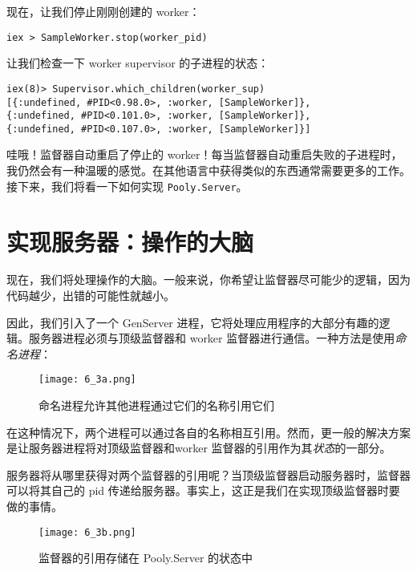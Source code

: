 现在，让我们停止刚刚创建的 worker：

\begin{code}{}
\begin{verbatim}
iex > SampleWorker.stop(worker_pid)
\end{verbatim}
\end{code}

让我们检查一下 worker supervisor 的子进程的状态：

\begin{code}{}
\begin{verbatim}
iex(8)> Supervisor.which_children(worker_sup)
[{:undefined, #PID<0.98.0>, :worker, [SampleWorker]},
{:undefined, #PID<0.101.0>, :worker, [SampleWorker]},
{:undefined, #PID<0.107.0>, :worker, [SampleWorker]}]
\end{verbatim}
\end{code}

哇哦！监督器自动重启了停止的
worker！每当监督器自动重启失败的子进程时，我仍然会有一种温暖的感觉。在其他语言中获得类似的东西通常需要更多的工作。接下来，我们将看一下如何实现
\texttt{Pooly.Server}。

\section{实现服务器：操作的大脑}

现在，我们将处理操作的大脑。一般来说，你希望让监督器尽可能少的逻辑，因为代码越少，出错的可能性就越小。

因此，我们引入了一个 GenServer
进程，它将处理应用程序的大部分有趣的逻辑。服务器进程必须与顶级监督器和
worker 监督器进行通信。一种方法是使用\emph{命名进程}：

\begin{figure}[!ht]
    \centering
    \texttt{[image: 6\_3a.png]}
    \caption{命名进程允许其他进程通过它们的名称引用它们}
    \label{fig:6_3a}
\end{figure}


在这种情况下，两个进程可以通过各自的名称相互引用。然而，更一般的解决方案是让服务器进程将对顶级监督器和worker 监督器的引用作为其\emph{状态}的一部分。

服务器将从哪里获得对两个监督器的引用呢？当顶级监督器启动服务器时，监督器可以将其自己的
pid 传递给服务器。事实上，这正是我们在实现顶级监督器时要做的事情。

\begin{figure}[!ht]
    \centering
    \texttt{[image: 6\_3b.png]}
    \caption{监督器的引用存储在 Pooly.Server 的状态中}
    \label{fig:6_3b}
\end{figure}


